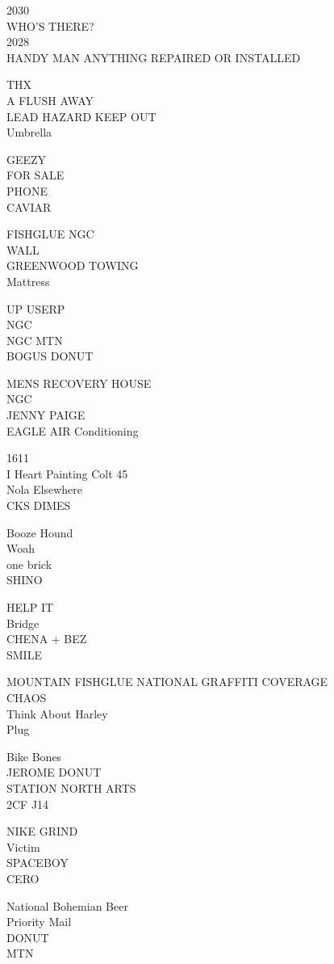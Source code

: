 \documentclass[10pt,letterpaper]{article}
\begin{document}
2030\\
WHO'S THERE?\\
2028\\
HANDY MAN ANYTHING REPAIRED OR INSTALLED

THX\\
A FLUSH AWAY\\
LEAD HAZARD KEEP OUT\\
Umbrella

GEEZY\\
FOR SALE\\
PHONE\\
CAVIAR

FISHGLUE NGC\\
WALL\\
GREENWOOD TOWING\\
Mattress

UP USERP\\
NGC\\
NGC MTN\\
BOGUS DONUT

MENS RECOVERY HOUSE\\
NGC\\
JENNY PAIGE\\
EAGLE AIR Conditioning

1611\\
I Heart Painting Colt 45\\
Nola Elsewhere\\
CKS DIMES

Booze Hound\\
Woah\\
one brick\\
SHINO

HELP IT\\
Bridge\\
CHENA + BEZ\\
SMILE

MOUNTAIN FISHGLUE NATIONAL GRAFFITI COVERAGE\\
CHAOS\\
Think About Harley\\
Plug

Bike Bones\\
JEROME DONUT\\
STATION NORTH ARTS\\
2CF J14

NIKE GRIND\\
Victim\\
SPACEBOY\\
CERO

National Bohemian Beer\\
Priority Mail\\
DONUT\\
MTN
\end{document}
